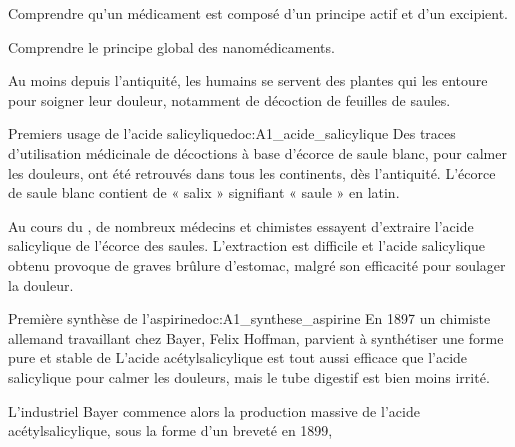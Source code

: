 \teteTermStssMedi
{}

\begin{objectifs}
  \item Comprendre qu'un médicament est composé d'un principe actif et d'un excipient.
  \item Comprendre le principe global des nanomédicaments.
\end{objectifs}

\begin{contexte}
  Au moins depuis l'antiquité, les humains se servent des plantes qui les entoure pour soigner leur douleur, notamment de décoction de feuilles de saules.
  
\end{contexte}


\begin{doc}{Premiers usage de l'acide salicylique}{doc:A1_acide_salicylique}
  Des traces d'utilisation médicinale de décoctions à base d'écorce de saule blanc, pour calmer les douleurs, ont été retrouvés dans tous les continents, dès l'antiquité.
  L'écorce de saule blanc contient de  « salix » signifiant « saule » en latin.

  Au cours du \!, de nombreux médecins et chimistes essayent d'extraire l'acide salicylique de l'écorce des saules. 
  L'extraction est difficile et l'acide salicylique obtenu provoque de graves brûlure d'estomac, malgré son efficacité pour soulager la douleur.
\end{doc}

\begin{doc}{Première synthèse de l'aspirine}{doc:A1_synthese_aspirine}
  En 1897 un chimiste allemand travaillant chez Bayer, Felix Hoffman, parvient à synthétiser une forme pure et stable de
  L'acide acétylsalicylique est tout aussi efficace que l'acide salicylique pour calmer les douleurs, mais le tube digestif est bien moins irrité.

  L'industriel Bayer commence alors la production massive de l'acide acétylsalicylique, sous la forme d'un  breveté en 1899, 
\end{doc}

